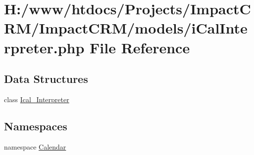 \hypertarget{iCalInterpreter_8php}{
\section{H:/www/htdocs/Projects/ImpactCRM/ImpactCRM/models/iCalInterpreter.php File Reference}
\label{iCalInterpreter_8php}
}
\subsection*{Data Structures}
\begin{DoxyCompactItemize}
\item 
class \hyperlink{classIcal__Interpreter}{Ical\_\-Interpreter}
\end{DoxyCompactItemize}
\subsection*{Namespaces}
\begin{DoxyCompactItemize}
\item 
namespace \hyperlink{namespaceCalendar}{Calendar}
\end{DoxyCompactItemize}
